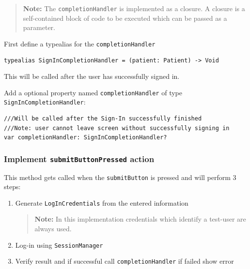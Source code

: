\documentclass{article}
\begin{document}
\begin{quote}
  \textbf{Note:} The \texttt{completionHandler} is implemented as a closure.
  A closure is a self-contained block of code to be executed which can be passed as a parameter.
\end{quote}



First define a typealias for the \texttt{completionHandler}

\begin{verbatim}
typealias SignInCompletionHandler = (patient: Patient) -> Void
\end{verbatim}
This will be called after the user has successfully signed in.

Add a optional property named \texttt{completionHandler} of type
\texttt{SignInCompletionHandler}:

\begin{verbatim}
///Will be called after the Sign-In successfully finished
///Note: user cannot leave screen without successfully signing in
var completionHandler: SignInCompletionHandler?
\end{verbatim}

\subsubsection{Implement \texttt{submitButtonPressed} action}\label{implement-submitbuttonpressed-action}

This method gets called when the \texttt{submitButton} is pressed and
will perform 3 steps:
\begin{enumerate}
\item
 Generate \texttt{LogInCredentials} from the entered information
 \begin{quote}
   \textbf{Note:} In this implementation credentials which identify a test-user are always used.
 \end{quote}
\item
  Log-in using \texttt{SessionManager}
\item
  Verify result and if successful call \texttt{completionHandler} if failed show error
\end{enumerate}
\end{document}
